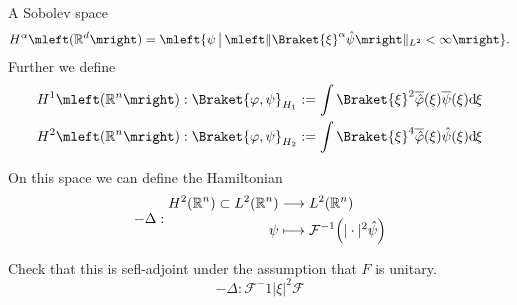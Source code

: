 \documentclass[12pt]{article}
\numberwithin{equation}{section}
\theoremstyle{plain}
\theoremstyle{plain}
\renewcommand{\d}{\mathrm{d}\hspace{-0.025cm}}
\renewcommand{\phi}{\varphi}
\begin{document}
\begin{defn}
	A Sobolev space 
	\[
		H^{\alpha} \mleft( \mathbb{R}^d \mright) = \mleft\{	\psi \, \big| \, \mleft\| \Braket{\xi}^{\alpha} \hat\psi \mright\|_{L^2} < \infty \mright\}.
	\]
	Further we define 
	\begin{align*}
		H^1 \mleft( \mathbb{R}^n \mright): \Braket{\phi,\psi}_{H_1} := \int \Braket{\xi}^2 \overline{\hat\phi}(\xi) \overline{\psi}(\xi) \d \xi \\
		H^2 \mleft( \mathbb{R}^n \mright): \Braket{\phi,\psi}_{H_2} := \int \Braket{\xi}^4 \overline{\hat\phi}(\xi) \hat\psi(\xi) \d \xi
	\end{align*}
\end{defn}

On this space we can define the Hamiltonian 
\[
	-\Delta : \begin{aligned}
		H^2 \mleft( \mathbb{R}^n \mright) \subset L^2 \mleft( \mathbb{R}^n \mright) &\longrightarrow L^2 \mleft(\mathbb{R}^n \mright)\\
		\psi & \longmapsto \mathcal F^{-1} \mleft( |\cdot|^2 \hat\psi \mright)
	\end{aligned}
\]

Check that this is sefl-adjoint under the assumption that $F$ is unitary.
\[
	-\Delta: \mathcal{F}^-1 |\xi|^2 \mathcal F
\]
\end{document}
